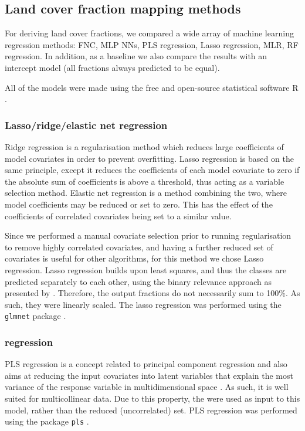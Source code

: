 \documentclass[a4paper,10pt]{article}
\begin{document}
\subsection{Land cover fraction mapping methods}

For deriving land cover fractions, we compared a wide array of machine learning regression methods: \ac{FNC}, \ac{MLP} \glspl{NN}, \ac{PLS} regression, Lasso regression, \ac{MLR}, \ac{RF} regression.
In addition, as a baseline we also compare the results with an intercept model (all fractions always predicted to be equal).

All of the models were made using the free and open-source statistical software R \citep{r_2019}.

\subsubsection{Lasso/ridge/elastic net regression}

Ridge regression is a regularisation method which reduces large coefficients of model covariates in order to prevent overfitting.
Lasso regression is based on the same principle, except it reduces the coefficients of each model covariate to zero if the absolute sum of coefficients is above a threshold, thus acting as a variable selection method.
Elastic net regression is a method combining the two, where model coefficients may be reduced or set to zero.
This has the effect of the coefficients of correlated covariates being set to a similar value.

Since we performed a manual covariate selection prior to running regularisation to remove highly correlated covariates, and having a further reduced set of covariates is useful for other algorithms, for this method we chose Lasso regression.
Lasso regression builds upon least squares, and thus the classes are predicted separately to each other, using the binary relevance approach as presented by \citet{karalas2016br}.
Therefore, the output fractions do not necessarily sum to 100\%.
As such, they were linearly scaled.
The lasso regression was performed using the \texttt{glmnet} package \citep{glmnet}.

\subsubsection{ regression}

\ac{PLS} regression is a concept related to principal component regression and also aims at reducing the input covariates into latent variables that explain the most variance of the response variable in multidimensional space \citep{martens_multivariate_1992}.
As such, it is well suited for multicollinear data.
Due to this property, the  were used as input to this model, rather than the reduced (uncorrelated) set.
\ac{PLS} regression was performed using the package \texttt{pls} \citep{pls}.
\end{document}
